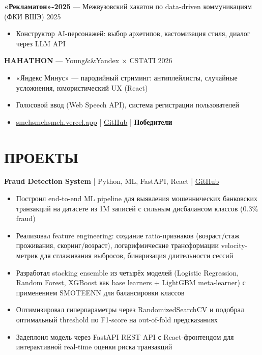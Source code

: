 \documentclass[10pt,a4paper]{article}
\begin{document}
\textbf{«Рекламатон»-2025} — Межвузовский хакатон по data-driven коммуникациям (ФКИ ВШЭ) \hfill 2025
\begin{itemize}[left=0pt, itemsep=1pt]
    \item Конструктор AI-персонажей: выбор архетипов, кастомизация стиля, диалог через LLM API
\end{itemize}


\textbf{HAHATHON} — Young\&\&Yandex $\times$ CSTATI \hfill 2026
\begin{itemize}[left=0pt, itemsep=1pt]
    \item «Яндекс Минус» — пародийный стриминг: антиплейлисты, случайные усложнения, юмористический UX (React)
    \item Голосовой ввод (Web Speech API), система регистрации пользователей
    \item \href{https://smehsmehsmeh.vercel.app}{smehsmehsmeh.vercel.app} | \href{https://github.com/hihihahovka/smehsmehsmeh}{GitHub} | \textbf{Победители}
\end{itemize}

\section{ПРОЕКТЫ}
\textbf{Fraud Detection System} | Python, ML, FastAPI, React | \href{https://github.com/Ahamidullin/Course-work}{GitHub}
\begin{itemize}[left=0pt, itemsep=1pt]
    \item Построил end-to-end ML pipeline для выявления мошеннических банковских транзакций на датасете из 1M записей с сильным дисбалансом классов (0.3\% fraud)
    \item Реализовал feature engineering: создание ratio-признаков (возраст/стаж проживания, скоринг/возраст), логарифмические трансформации velocity-метрик для сглаживания выбросов, бинаризация длительности сессий
    \item Разработал stacking ensemble из четырёх моделей (Logistic Regression, Random Forest, XGBoost как base learners + LightGBM meta-learner) с применением SMOTEENN для балансировки классов
    \item Оптимизировал гиперпараметры через RandomizedSearchCV и подобрал оптимальный threshold по F1-score на out-of-fold предсказаниях
    \item Задеплоил модель через FastAPI REST API с React-фронтендом для интерактивной real-time оценки риска транзакций
\end{itemize}
\end{document}
